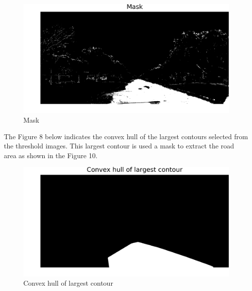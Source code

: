 \documentclass[journal]{IEEEtran}
\begin{document}
\begin{figure}[!htb]
\begin{center}
\includegraphics[scale=0.65]{Images/4_Mask.png}
\end{center}
\caption{Mask}
\end{figure}

\vspace{0.5cm}

\noindent The Figure 8 below indicates the convex hull of the largest contours selected from the threshold images. This largest contour is used a mask to extract the road area as shown in the Figure 10.


\begin{figure}[!htb]
\begin{center}
\includegraphics[scale=0.65]{Images/5_Convex_hull_of_largest_contour.png}
\end{center}
\caption{Convex hull of largest contour}
\end{figure}
\end{document}
